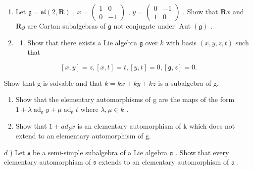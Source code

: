 \begin{enumerate}
\def\labelenumi{\arabic{enumi})}
\setcounter{enumi}{3}
\item
  Let \(\mathfrak{g} = \mathfrak{sl}(2, \mathbf{R})\) , \(x = \begin{pmatrix} 1 & 0 \\ 0 & -1 \end{pmatrix}\) , \(y = \begin{pmatrix} 0 & -1 \\ 1 & 0 \end{pmatrix}\) . Show that \(\mathbf{R}x\) and \(\mathbf{R}y\) are Cartan subalgebras of \(\mathfrak{g}\) not conjugate under \(\operatorname{Aut}(\mathfrak{g})\) .
\item
  \begin{enumerate}
  \def\labelenumii{\alph{enumii})}
  \tightlist
  \item
    Show that there exists a Lie algebra \(\mathfrak{g}\) over \(k\) with basis \((x,y,z,t)\) such that
  \end{enumerate}
\end{enumerate}

\[
[ x, y ] = z, [ x, t ] = t, [ y, t ] = 0, [ \mathfrak {g}, z ] = 0.
\]

Show that g is solvable and that \(k = kx + ky + kz\) is a subalgebra of g.

\begin{enumerate}
\def\labelenumi{\alph{enumi})}
\setcounter{enumi}{1}
\item
  Show that the elementary automorphisms of g are the maps of the form \(1 + \lambda \operatorname{ad}_{\mathfrak{g}} y + \mu \operatorname{ad}_{\mathfrak{g}} t\) where \(\lambda, \mu \in k\) .
\item
  Show that \(1 + ad_{k}x\) is an elementary automorphism of k which does not extend to an elementary automorphism of g.
\end{enumerate}

\(d\) ) Let \(\mathfrak{s}\) be a semi-simple subalgebra of a Lie algebra \(\mathfrak{a}\) . Show that every elementary automorphism of \(\mathfrak{s}\) extends to an elementary automorphism of \(\mathfrak{a}\) .

